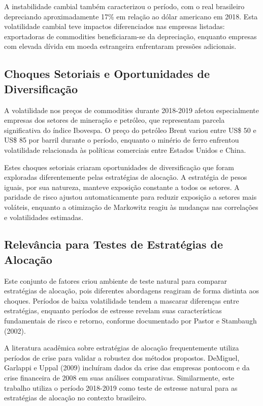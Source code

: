 A instabilidade cambial também caracterizou o período, com o real brasileiro depreciando aproximadamente 17\% em relação ao dólar americano em 2018. Esta volatilidade cambial teve impactos diferenciados nas empresas listadas: exportadoras de commodities beneficiaram-se da depreciação, enquanto empresas com elevada dívida em moeda estrangeira enfrentaram pressões adicionais.

\subsection{Choques Setoriais e Oportunidades de Diversificação}

A volatilidade nos preços de commodities durante 2018-2019 afetou especialmente empresas dos setores de mineração e petróleo, que representam parcela significativa do índice Ibovespa. O preço do petróleo Brent variou entre US\$ 50 e US\$ 85 por barril durante o período, enquanto o minério de ferro enfrentou volatilidade relacionada às políticas comerciais entre Estados Unidos e China.

Estes choques setoriais criaram oportunidades de diversificação que foram exploradas diferentemente pelas estratégias de alocação. A estratégia de pesos iguais, por sua natureza, manteve exposição constante a todos os setores. A paridade de risco ajustou automaticamente para reduzir exposição a setores mais voláteis, enquanto a otimização de Markowitz reagiu às mudanças nas correlações e volatilidades estimadas.

\subsection{Relevância para Testes de Estratégias de Alocação}

Este conjunto de fatores criou ambiente de teste natural para comparar estratégias de alocação, pois diferentes abordagens reagiram de forma distinta aos choques. Períodos de baixa volatilidade tendem a mascarar diferenças entre estratégias, enquanto períodos de estresse revelam suas características fundamentais de risco e retorno, conforme documentado por Pastor e Stambaugh (2002).

A literatura acadêmica sobre estratégias de alocação frequentemente utiliza períodos de crise para validar a robustez dos métodos propostos. DeMiguel, Garlappi e Uppal (2009) incluíram dados da crise das empresas pontocom e da crise financeira de 2008 em suas análises comparativas. Similarmente, este trabalho utiliza o período 2018-2019 como teste de estresse natural para as estratégias de alocação no contexto brasileiro.

